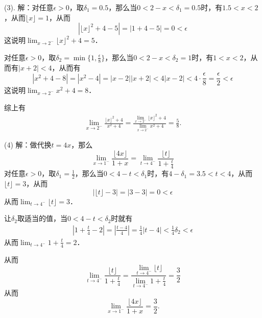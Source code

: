 (3). 解：对任意$\epsilon > 0$，取$\delta_1 = 0.5$，那么当$0 < 2-x < \delta_1 = 0.5$时，有$1.5 < x < 2$，从而$\lfloor x \rfloor = 1$，从而
\begin{equation}
    |\lfloor x \rfloor^2 + 4 - 5| = |1 + 4 - 5| = 0 < \epsilon
\end{equation}
这说明$\displaystyle\lim_{x \to 2^-} \lfloor x \rfloor^2 + 4 = 5$．

对任意$\epsilon > 0$，取$\delta_2 = \min \{ 1, \displaystyle\frac{\epsilon}{8} \}$，那么当$0 < 2 - x < \delta_2 = 1$时，有$1 < x < 2$，从而有$|x+2| < 4$，从而有
\begin{equation}
    |x^2 + 4 - 8| = |x^2 - 4| = |x-2||x+2| < 4 |x-2| < 4 \cdot \frac{\epsilon}{8} = \frac{\epsilon}{2} < \epsilon
\end{equation}
这说明$\displaystyle\lim_{x \to 2^-} x^2 + 4 = 8$．

综上有
\begin{align}
    \lim_{x \to 2^-} \frac{\lfloor x \rfloor^2 + 4}{x^2 + 4} = \frac{\displaystyle\lim_{x \to 2^-} \lfloor x \rfloor^2 + 4}{\displaystyle\lim_{x \to 2^-} x^2 + 4} = \frac{5}{8}.
\end{align}

(4) 解：做代换$t = 4x$，那么
\begin{equation}
    \lim_{x \to 1^-} \frac{\lfloor 4x \rfloor}{1+x} = \lim_{t \to 4^-} \frac{\lfloor t \rfloor}{1+\displaystyle\frac{t}{4}}
\end{equation}
对任意$\epsilon > 0$，取$\delta_1 = \displaystyle\frac{1}{2}$，那么当$0 < 4 - t < \delta_1$时，有$4 - \delta_1 = 3.5 < t < 4$，从而$\lfloor t \rfloor = 3$，从而
\begin{equation}
    |\lfloor t \rfloor - 3| = |3 - 3| = 0 < \epsilon
\end{equation}
从而$\displaystyle\lim_{t \to 4^-} \lfloor t \rfloor = 3$．

让$\delta_2$取适当的值，当$0 < 4-t < \delta_2$时就有
\begin{align}
    |1 + \frac{t}{4} - 2| = |\frac{t-4}{4}| = \frac{1}{4}|t-4| < \frac{1}{4}\delta_2 < \epsilon
\end{align}
从而$\displaystyle\lim_{t \to 4^-} 1 + \displaystyle\frac{t}{4} = 2$．

从而
\begin{equation}
    \lim_{t \to 4^-} \frac{\lfloor t \rfloor}{1+\displaystyle\frac{t}{4}} = \frac{\displaystyle\lim_{t \to 4^-} \lfloor t \rfloor}{\displaystyle\lim_{t \to 4^-} 1 + \displaystyle\frac{t}{4}} = \frac{3}{2}
\end{equation}
从而
\begin{equation}
    \lim_{x \to 1^-} \frac{\lfloor 4x \rfloor}{1+x} = \frac{3}{2}.
\end{equation}

